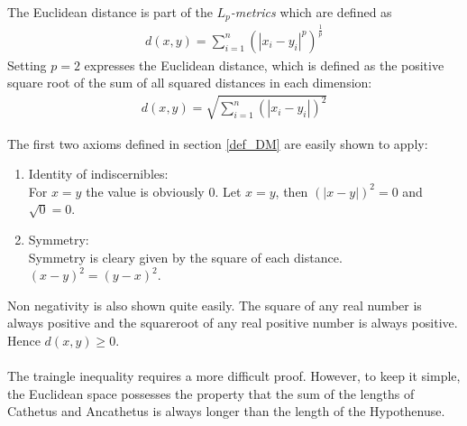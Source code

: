 The Euclidean distance is part of the $L_p$\textit{-metrics} which are defined as
\begin{align} \label{lpmetric}
    d(x, y) = \sum_{i=1}^{n}(|x_i-y_i|^p)^\frac{1}{p}
\end{align}
Setting $p = 2$ expresses the Euclidean distance, which is defined as the positive square root of the sum of all squared distances in each dimension:
\begin{align}
    d(x, y) = \sqrt{\sum_{i = 1}^{n}(|x_i - y_i|)^2}
\end{align}

The first two axioms defined in section \ref{def_DM} are easily shown to apply:
\begin{enumerate}

\item Identity of indiscernibles:\\
For $x = y$ the value is obviously $0$. Let $x = y$, then $(|x - y|)^2 = 0$ and $\sqrt{0} = 0$.

\item Symmetry: \\
Symmetry is cleary given by the square of each distance.\\
$(x - y)^2 = (y - x)^2$.
\end{enumerate}

Non negativity is also shown quite easily. The square of any real number is always positive and the squareroot of any real positive number is always positive. Hence $d(x, y) \geq 0$.\\
\ \\
The traingle inequality requires a more difficult proof. However, to keep it simple, the Euclidean space possesses the property that the sum of the lengths of Cathetus and Ancathetus is always longer than the length of the Hypothenuse. \cite{MMDS}